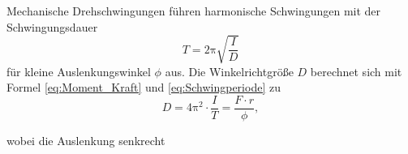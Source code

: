 Mechanische Drehschwingungen führen harmonische Schwingungen mit der Schwingungsdauer
\begin{equation}
	\label{eq:Schwingperiode}
	T=2\mathup{\pi} \sqrt{\frac{I}{D}}
\end{equation}
für kleine Auslenkungswinkel $\phi$ aus. 
Die Winkelrichtgröße $D$ berechnet sich mit Formel \eqref{eq:Moment_Kraft} und \eqref{eq:Schwingperiode} zu
\begin{equation}
	\label{eq:Winkelricht}
	D= 4\mathup{\pi^{2}}\cdot\frac{I}{T} =\frac{F\cdot r}{\phi},
\end{equation}


wobei die Auslenkung senkrecht %

